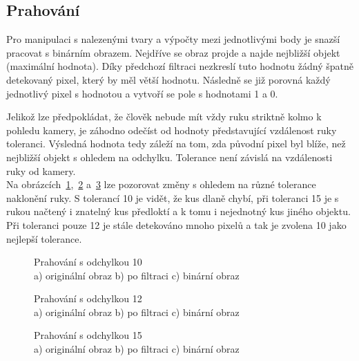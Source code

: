 \subsection{Prahování}
Pro manipulaci s nalezenými tvary a výpočty mezi jednotlivými body je snazší pracovat s binárním obrazem. Nejdříve se obraz projde a najde nejbližší objekt (maximální hodnota). Díky předchozí filtraci nezkreslí tuto hodnotu žádný špatně detekovaný pixel, který by měl větší hodnotu. Následně se již porovná každý jednotlivý pixel s hodnotou a vytvoří se pole s hodnotami 1 a 0.

Jelikož lze předpokládat, že člověk nebude mít vždy ruku striktně kolmo k pohledu kamery, je záhodno odečíst od hodnoty představující vzdálenost ruky toleranci. Výsledná hodnota tedy záleží na tom, zda původní pixel byl blíže, než nejbližší objekt s ohledem na odchylku. Tolerance není závislá na vzdálenosti ruky od kamery.\\
Na obrázcích~\ref{pic12},~\ref{pic13} a~\ref{pic14} lze pozorovat změny s ohledem na různé tolerance naklonění ruky. S tolerancí 10 je vidět, že kus dlaně chybí, při toleranci 15 je s rukou načtený i znatelný kus předloktí a k tomu i nejednotný kus jiného objektu. Při toleranci pouze 12 je stále detekováno mnoho pixelů a tak je zvolena 10 jako nejlepší tolerance.\\

\begin{figure}[htp]
\centering
{} \hfill
{} \hfill
{}
\caption{Prahování s odchylkou 10 \\ a) originální obraz b) po filtraci c) binární obraz}
\label{pic12}
\end{figure}
\begin{figure}[htp]
\centering
{} \hfill
{} \hfill
{}
\caption{Prahování s odchylkou 12 \\ a) originální obraz b) po filtraci c) binární obraz}
\label{pic13}
\end{figure}
\begin{figure}[htp]
\centering
{} \hfill
{} \hfill
{}
\caption{Prahování s odchylkou 15 \\ a) originální obraz b) po filtraci c) binární obraz}
\label{pic14}
\end{figure}
\newpage
